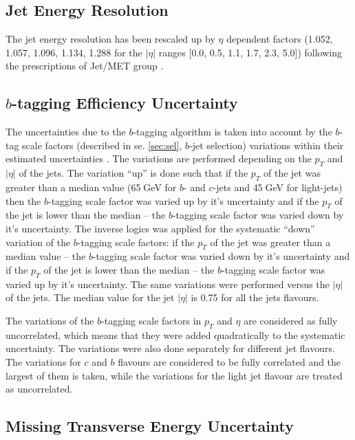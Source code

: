 \subsection{Jet Energy Resolution}

The jet energy resolution has been rescaled up by $\eta$ dependent factors (1.052, 1.057, 1.096, 1.134, 1.288 for the $|\eta|$ ranges [0.0, 0.5, 1.1, 1.7, 2.3, 5.0]) following 
the prescriptions of Jet/MET group \cite{TWikiSystJER}.

\subsection{$b$-tagging Efficiency Uncertainty}

The uncertainties due to the $b$-tagging algorithm is taken into account by the $b$-tag scale factors (described in se. \ref{sec:sel}, 
$b$-jet selection) variations within their estimated
uncertainties \cite{CMS-PAS-BTV-13-001}. The variations are performed depending on the $p_{T}$ and $|\eta|$ of the jets. The variation ``up'' 
is done such that if the $p_{T}$ of the jet was greater than a median value (65$\;$GeV for $b$- and $c$-jets and 45$\;$GeV for light-jets) then 
the $b$-tagging scale factor was varied up by it's uncertainty and if the $p_{T}$ of the jet is lower than the median -- the $b$-tagging 
scale factor was varied down by it's uncertainty. The inverse logics was applied for the systematic ``down'' variation of the $b$-tagging 
scale factors: if the $p_{T}$ of the jet was greater than a median value -- the $b$-tagging scale factor was varied down by it's uncertainty 
and if the $p_{T}$ of the jet is lower than the median -- the $b$-tagging scale factor was varied up by it's uncertainty. 
The same variations were performed versus the $|\eta|$ of the jets. The median value for the jet $|\eta|$ is 0.75 for all the jets flavours.

The variations of the $b$-tagging scale factors in $p_{T}$ and $\eta$ are considered as fully uncorrelated, which means that they were added
quadratically to the systematic uncertainty. The variations were also done separately for different jet flavours. The variations for $c$ and $b$ 
flavours are considered to be fully correlated and the largest of them is taken, while the variations for the light jet flavour are treated as 
uncorrelated.

\subsection{Missing Transverse Energy Uncertainty}

